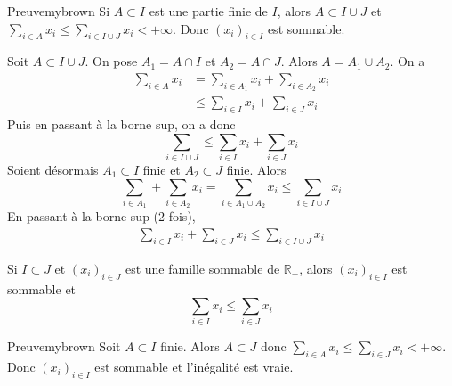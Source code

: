     \begin{demo}{Preuve}{mybrown}
        Si $A \subset I$ est une partie finie de $I$, alors $A \subset I \cup J$ et $\sum_{i \in A} x_i \leq \sum_{i \in I \cup J} x_i < + \infty$. Donc $(x_i)_{i \in I}$ est sommable.

        Soit $A \subset I \cup J$. On pose $A_1 = A \cap I$ et $A_2 = A \cap J$. Alors $A = A_1 \cup A_2$. On a 
        \begin{align*}
            \sum_{i \in A} x_i 
            &= \sum_{i \in A_1} x_i + \sum_{i \in A_2} x_i \\
            &\leq \sum_{i \in I} x_i + \sum_{i \in J} x_i 
        \end{align*}
        Puis en passant à la borne sup, on a donc 
        \[ \sum_{i \in I \cup J} \leq \sum_{i \in I} x_i + \sum_{i \in J} x_i \]   
        Soient désormais $A_1 \subset I$ finie et $A_2 \subset J$ finie. Alors
        \[ \sum_{i \in A_1} + \sum_{i \in A_2} x_i = \sum_{i \in A_1 \cup A_2} x_i \leq \sum_{i \in I \cup J} x_i \]    
        En passant à la borne sup (2 fois),
        \begin{align*}
            \sum_{i \in I} x_i + \sum_{i \in J} x_i \leq \sum_{i \in I \cup J} x_i
        \end{align*}
    \end{demo}

    \begin{lem}{}{}
        Si $I \subset J$ et $(x_i)_{i \in J}$ est une famille sommable de $\mathbb{R}_+$, alors $(x_i)_{i \in I}$ est sommable et 
        \[ \sum_{i \in I} x_i \leq \sum_{i \in J} x_i \]   
    \end{lem}

    \begin{demo}{Preuve}{mybrown}
        Soit $A \subset I$ finie. Alors $A \subset J$ donc $\sum_{i \in A} x_i \leq \sum_{i \in J} x_i < + \infty$. Donc $(x_i)_{i \in I}$ est sommable et l’inégalité est vraie.
    \end{demo}

